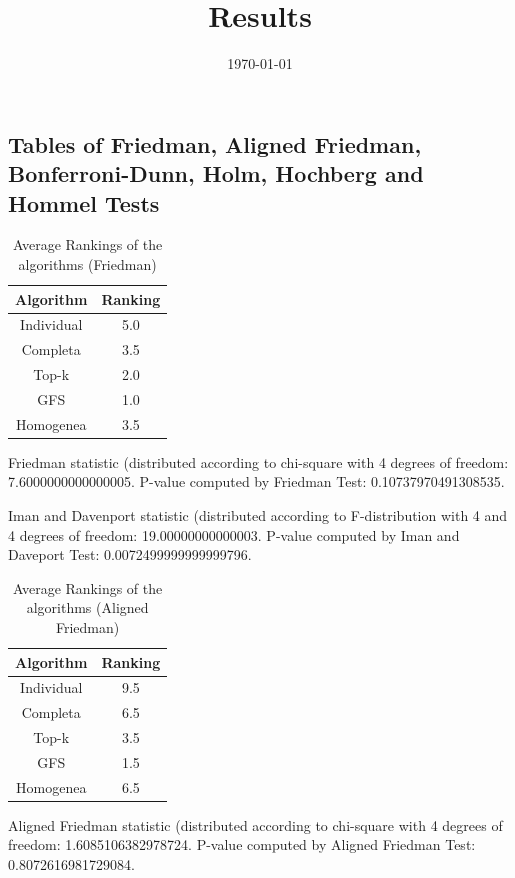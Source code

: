 \documentclass[a4paper,10pt]{article}
\title{Results}
\author{}
\date{\today}
\begin{document}
\begin{landscape}
\oddsidemargin 0in \topmargin 0in\maketitle
\section{Tables of Friedman, Aligned Friedman, Bonferroni-Dunn, Holm, Hochberg and Hommel Tests}
\begin{table}[!htp]
\centering
\caption{Average Rankings of the algorithms (Friedman)
}\begin{tabular}{c|c}
Algorithm&Ranking\\
\hline
Individual&5.0\\
Completa&3.5\\
Top-k&2.0\\
GFS&1.0\\
Homogenea&3.5\\
\end{tabular}
\end{table}


Friedman statistic (distributed according to chi-square with 4 degrees of freedom: 7.6000000000000005. 
P-value computed by Friedman Test: 0.10737970491308535.\newline

Iman and Davenport statistic (distributed according to F-distribution with 4 and 4 degrees of freedom: 19.00000000000003. 
P-value computed by Iman and Daveport Test: 0.0072499999999999796.\newline


\newpage

\begin{table}[!htp]
\centering
\caption{Average Rankings of the algorithms (Aligned Friedman)
}\begin{tabular}{c|c}
Algorithm&Ranking\\
\hline
Individual&9.5\\
Completa&6.5\\
Top-k&3.5\\
GFS&1.5\\
Homogenea&6.5\\
\end{tabular}
\end{table}


Aligned Friedman statistic (distributed according to chi-square with 4 degrees of freedom: 1.6085106382978724. 
P-value computed by Aligned Friedman Test: 0.8072616981729084.\newline



\end{landscape}
\end{document}
